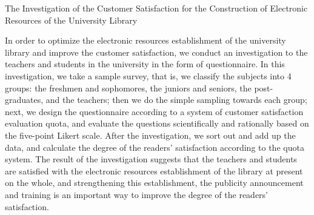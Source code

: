 \begin{englishabstract}{The Investigation of the Customer Satisfaction for the Construction of Electronic Resources of the University Library}

    In order to optimize the electronic resources establishment of the university library and improve the customer satisfaction, we conduct an investigation to the teachers and students in the university in the form of questionnaire. In this investigation, we take a sample survey, that is, we classify the subjects into 4 groups: the freshmen and sophomores, the juniors and seniors, the post-graduates, and the teachers; then we do the simple sampling towards each group; next, we design the questionnaire according to a system of customer satisfaction evaluation quota, and evaluate the questions scientifically and rationally based on the five-point Likert scale. After the investigation, we sort out and add up the data, and calculate the degree of the readers’ satisfaction according to the quota system. The result of the investigation suggests that the teachers and students are satisfied with the electronic resources establishment of the library at present on the whole, and strengthening this establishment, the publicity announcement and training is an important way to improve the degree of the readers’ satisfaction.

\end{englishabstract}